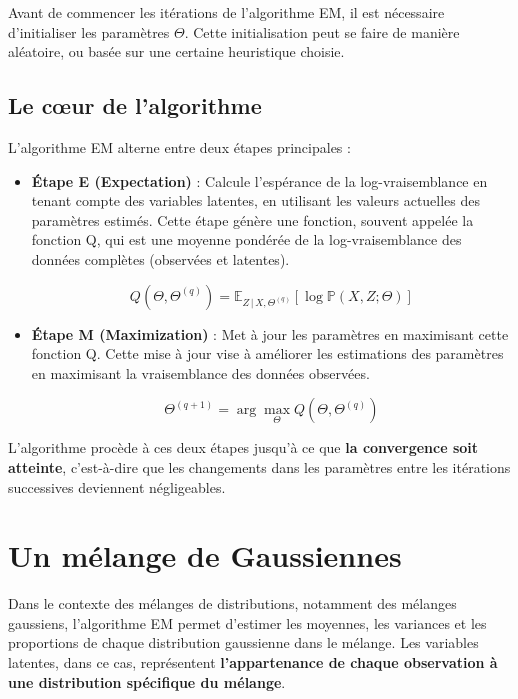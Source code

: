 \documentclass[
]{article}
\begin{document}
Avant de commencer les itérations de l'algorithme EM, il est nécessaire
d'initialiser les paramètres \(\Theta\). Cette initialisation peut se
faire de manière aléatoire, ou basée sur une certaine heuristique
choisie.

\hypertarget{le-cux153ur-de-lalgorithme}{%
\subsection{Le cœur de l'algorithme}\label{le-cux153ur-de-lalgorithme}}

L'algorithme EM alterne entre deux étapes principales :

\begin{itemize}
  \item \textbf{Étape E (Expectation)} : Calcule l'espérance de la log-vraisemblance en tenant compte des variables latentes, en utilisant les valeurs actuelles des paramètres estimés. Cette étape génère une fonction, souvent appelée la fonction Q, qui est une moyenne pondérée de la log-vraisemblance des données complètes (observées et latentes).
  
  \[ Q(\Theta, \Theta^{(q)}) = \mathbb{E}_{Z\,|\,X,\Theta^{(q)}}\left[\log \mathbb{P}(X, Z; \Theta)\right] \]
  
  \item \textbf{Étape M (Maximization)} : Met à jour les paramètres en maximisant cette fonction Q. Cette mise à jour vise à améliorer les estimations des paramètres en maximisant la vraisemblance des données observées.
  
  \[ \Theta^{(q+1)} = \arg \max_{\Theta} Q(\Theta, \Theta^{(q)}) \]
  
\end{itemize}

L'algorithme procède à ces deux étapes jusqu'à ce que
\textbf{la convergence soit atteinte}, c'est-à-dire que les changements
dans les paramètres entre les itérations successives deviennent
négligeables.

\hypertarget{un-muxe9lange-de-gaussiennes}{%
\section{Un mélange de Gaussiennes}\label{un-muxe9lange-de-gaussiennes}}

Dans le contexte des mélanges de distributions, notamment des mélanges
gaussiens, l'algorithme EM permet d'estimer les moyennes, les variances
et les proportions de chaque distribution gaussienne dans le mélange.
Les variables latentes, dans ce cas, représentent
\textbf{l'appartenance de chaque observation à une distribution spécifique du mélange}.
\end{document}
